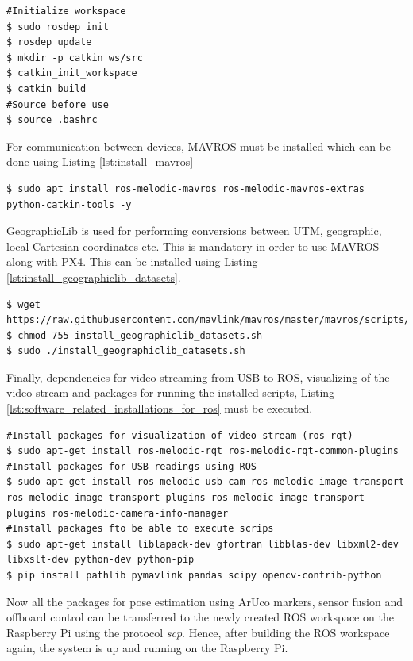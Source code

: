 \documentclass[../Head/report.tex]{subfiles}
\begin{document}
\begin{lstlisting}[frame=none, caption={Initiating ROS workspace},label=lst:init_ros_workspace]
#Initialize workspace
$ sudo rosdep init
$ rosdep update
$ mkdir -p catkin_ws/src
$ catkin_init_workspace 
$ catkin build
#Source before use
$ source .bashrc
\end{lstlisting}

For communication between devices, MAVROS must be installed which can be done using Listing \ref{lst:install_mavros}

\begin{lstlisting}[frame=none, caption={Installation of MAVROS},label=lst:install_mavros]
$ sudo apt install ros-melodic-mavros ros-melodic-mavros-extras python-catkin-tools -y
\end{lstlisting}

\href{https://geographiclib.sourceforge.io/}{GeographicLib} is used for performing conversions between UTM, geographic, local Cartesian coordinates etc. This is mandatory in order to use MAVROS along with PX4. This can be installed using Listing \ref{lst:install_geographiclib_datasets}. 
\begin{lstlisting}[frame=none, caption={Fetching and installation of the geographiclib dataset},label=lst:install_geographiclib_datasets]
$ wget https://raw.githubusercontent.com/mavlink/mavros/master/mavros/scripts/install_geographiclib_datasets.sh
$ chmod 755 install_geographiclib_datasets.sh
$ sudo ./install_geographiclib_datasets.sh
\end{lstlisting}

Finally, dependencies for video streaming from USB to ROS, visualizing of the video stream and packages for running the installed scripts, Listing \ref{lst:software_related_installations_for_ros} must be executed. 

\begin{lstlisting}[frame=none, caption={Installation of ROS ralated software },label=lst:software_related_installations_for_ros]
#Install packages for visualization of video stream (ros rqt)
$ sudo apt-get install ros-melodic-rqt ros-melodic-rqt-common-plugins
#Install packages for USB readings using ROS
$ sudo apt-get install ros-melodic-usb-cam ros-melodic-image-transport ros-melodic-image-transport-plugins ros-melodic-image-transport-plugins ros-melodic-camera-info-manager
#Install packages fto be able to execute scrips
$ sudo apt-get install liblapack-dev gfortran libblas-dev libxml2-dev libxslt-dev python-dev python-pip
$ pip install pathlib pymavlink pandas scipy opencv-contrib-python
\end{lstlisting}

Now all the packages for pose estimation using ArUco markers, sensor fusion and offboard control can be transferred to the newly created ROS workspace on the Raspberry Pi using the protocol \textit{scp}. Hence, after building the ROS workspace again, the system is up and running on the Raspberry Pi.   


\end{document}
